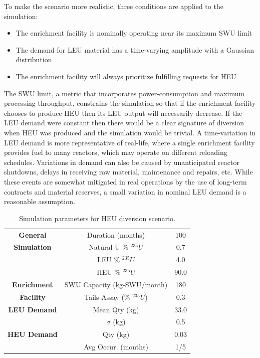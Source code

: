 To make the scenario more realistic, three conditions are applied to the simulation:
\begin{itemize}
\item{The enrichment facility is nominally operating near its maximum \gls{SWU} limit}
\item{The demand for \gls{LEU} material has a time-varying amplitude with a Gaussian distribution}
\item{The enrichment facility will always prioritize fulfilling requests for \gls{HEU}}
\end{itemize}
The \gls{SWU} limit, a metric that incorporates power-consumption and maximum processing throughput, constrains the simulation so that if the enrichment facility chooses to produce \gls{HEU} then its \gls{LEU} output will necessarily decrease.  If the \gls{LEU} demand were constant then there would be a clear signature of diversion when \gls{HEU} was produced and the simulation would be trivial.  A time-variation in \gls{LEU} demand is more representative of real-life, where a single enrichment facility provides fuel to many reactors, which may operate on different reloading schedules. Variations in demand can also be caused by unanticipated reactor shutdowns, delays in receiving raw material, maintenance and repairs, etc.  While these events are somewhat mitigated in real operations by the use of long-term contracts and material reserves, a small variation in nominal \gls{LEU} demand is a reasonable assumption.

\begin{table}
\centering
\begin{tabular}{|c|c|c|}
\hline
\textbf{General}    & Duration (months)      & 100  \\
\textbf{Simulation} & Natural U \% $^{235}U$ & 0.7  \\
                    & LEU \% $^{235}U$    & 4.0  \\
                    & HEU \% $^{235}U$    & 90.0 \\
\hline
\textbf{Enrichment} & SWU Capacity (kg-SWU/month) & 180  \\
\textbf{Facility}   & Tails Assay (\% $^{235}U$)   & 0.3  \\
\hline
\textbf{LEU Demand} & Mean Qty (kg)       & 33.0  \\
                    & $\sigma$ (kg)       & 0.5  \\
\hline
\textbf{HEU Demand} & Qty (kg)            & 0.03  \\
                    & Avg Occur. (months) & 1/5 \\ 
\hline
\end{tabular}
\caption{Simulation parameters for \gls{HEU} diversion scenario.}
\label{tab:sim_params}
\end{table}


